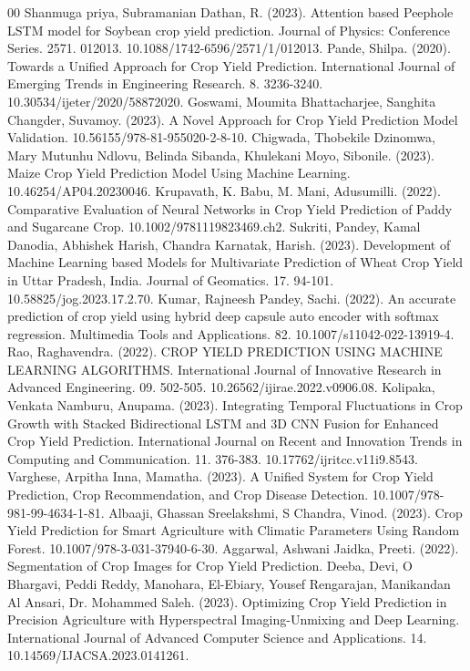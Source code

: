 \documentclass[conference]{IEEEtran}
\begin{document}
\begin{thebibliography}{00}
 Shanmuga priya, Subramanian Dathan, R. (2023). Attention based Peephole LSTM model for Soybean crop yield prediction. Journal of Physics: Conference Series. 2571. 012013. 10.1088/1742-6596/2571/1/012013. 
 Pande, Shilpa. (2020). Towards a Unified Approach for Crop Yield Prediction. International Journal of Emerging Trends in Engineering Research. 8. 3236-3240. 10.30534/ijeter/2020/58872020. 
 Goswami, Moumita Bhattacharjee, Sanghita Changder, Suvamoy. (2023). A Novel Approach for Crop Yield Prediction Model Validation. 10.56155/978-81-955020-2-8-10. 
 Chigwada, Thobekile Dzinomwa, Mary Mutunhu Ndlovu, Belinda Sibanda, Khulekani Moyo, Sibonile. (2023). Maize Crop Yield Prediction Model Using Machine Learning. 10.46254/AP04.20230046. 
 Krupavath, K. Babu, M. Mani, Adusumilli. (2022). Comparative Evaluation of Neural Networks in Crop Yield Prediction of Paddy and Sugarcane Crop. 10.1002/9781119823469.ch2. 
 Sukriti, Pandey, Kamal Danodia, Abhishek Harish, Chandra Karnatak, Harish. (2023). Development of Machine Learning based Models for Multivariate Prediction of Wheat Crop Yield in Uttar Pradesh, India. Journal of Geomatics. 17. 94-101. 10.58825/jog.2023.17.2.70. 
 Kumar, Rajneesh Pandey, Sachi. (2022). An accurate prediction of crop yield using hybrid deep capsule auto encoder with softmax regression. Multimedia Tools and Applications. 82. 10.1007/s11042-022-13919-4. 
 Rao, Raghavendra. (2022). CROP YIELD PREDICTION USING MACHINE LEARNING ALGORITHMS. International Journal of Innovative Research in Advanced Engineering. 09. 502-505. 10.26562/ijirae.2022.v0906.08.
 Kolipaka, Venkata Namburu, Anupama. (2023). Integrating Temporal Fluctuations in Crop Growth with Stacked Bidirectional LSTM and 3D CNN Fusion for Enhanced Crop Yield Prediction. International Journal on Recent and Innovation Trends in Computing and Communication. 11. 376-383. 10.17762/ijritcc.v11i9.8543. 
 Varghese, Arpitha Inna, Mamatha. (2023). A Unified System for Crop Yield Prediction, Crop Recommendation, and Crop Disease Detection. 10.1007/978-981-99-4634-1-81. 
 Albaaji, Ghassan Sreelakshmi, S Chandra, Vinod. (2023). Crop Yield Prediction for Smart Agriculture with Climatic Parameters Using Random Forest. 10.1007/978-3-031-37940-6-30. 
 Aggarwal, Ashwani Jaidka, Preeti. (2022). Segmentation of Crop Images for Crop Yield Prediction. 
 Deeba, Devi, O Bhargavi, Peddi Reddy, Manohara, El-Ebiary, Yousef Rengarajan, Manikandan Al Ansari, Dr. Mohammed Saleh. (2023). Optimizing Crop Yield Prediction in Precision Agriculture with Hyperspectral Imaging-Unmixing and Deep Learning. International Journal of Advanced Computer Science and Applications. 14. 10.14569/IJACSA.2023.0141261. 

\end{thebibliography}
\end{document}
